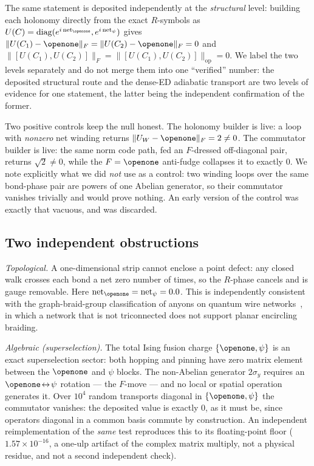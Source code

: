 \documentclass[aps,pra,twocolumn,superscriptaddress,longbibliography,floatfix,nofootinbib]{revtex4-2}
\newcommand{\Id}{\openone}
\newcommand{\Fnorm}[1]{\lVert #1 \rVert_{F}}
\newcommand{\Opnorm}[1]{\lVert #1 \rVert_{\mathrm{op}}}
\begin{document}
The same statement is deposited independently at the \emph{structural} level:
building each holonomy directly from the exact $R$-symbols as
$U(C)=\mathrm{diag}(e^{i\,\mathrm{net}_{\Id}},e^{i\,\mathrm{net}_{\psi}})$
gives $\Fnorm{U(C_1)-\Id} = \Fnorm{U(C_2)-\Id} = 0$ and
$\Fnorm{[U(C_1),U(C_2)]} = \Opnorm{[U(C_1),U(C_2)]} = 0$. We label the two
levels separately and do not merge them into one ``verified'' number: the
deposited structural route and the dense-ED adiabatic transport are two levels
of evidence for one statement, the latter being the independent confirmation of
the former.

Two positive controls keep the null honest. The holonomy builder is live: a
loop with \emph{nonzero} net winding returns $\Fnorm{U_W-\Id}=2\ne0$. The
commutator builder is live: the same norm code path, fed an $F$-dressed
off-diagonal pair, returns $\sqrt2\ne0$, while the $F=\Id$ anti-fudge collapses
it to exactly $0$. We note explicitly what we did \emph{not} use as a control:
two winding loops over the same bond-phase pair are powers of one Abelian
generator, so their commutator vanishes trivially and would prove nothing. An
early version of the control was exactly that vacuous, and was discarded.

\subsection{Two independent obstructions}
\label{sec:obstructions}

\emph{Topological.} A one-dimensional strip cannot enclose a point defect: any
closed walk crosses each bond a net zero number of times, so the $R$-phase
cancels and is gauge removable. Here
$\mathrm{net}_{\Id}=\mathrm{net}_{\psi}=0.0$. This is independently consistent
with the graph-braid-group classification of anyons on quantum wire
networks~\cite{ConlonSlingerland2022,Maciazek2023}, in which a network that is
not triconnected does not support planar encircling braiding.

\emph{Algebraic (superselection).} The total Ising fusion charge
$\{\Id,\psi\}$ is an exact superselection sector: both hopping and pinning have
zero matrix element between the $\Id$ and $\psi$ blocks. The non-Abelian
generator $2\sigma_y$ requires an $\Id\!\leftrightarrow\!\psi$ rotation --- the
$F$-move --- and no local or spatial operation generates it. Over $10^{4}$
random transports diagonal in $\{\Id,\psi\}$ the commutator vanishes: the
deposited value is exactly $0$, as it must be, since operators diagonal in a
common basis commute by construction. An independent reimplementation of the
\emph{same} test reproduces this to its floating-point floor
($1.57\times10^{-16}$, a one-ulp artifact of the complex matrix multiply, not a
physical residue, and not a second independent check).
\end{document}
